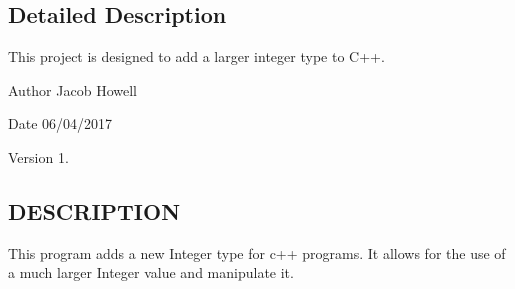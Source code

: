 \subsection{Detailed Description}
This project is designed to add a larger integer type to C++. 

\begin{DoxyAuthor}{Author}
Jacob Howell 
\end{DoxyAuthor}
\begin{DoxyDate}{Date}
06/04/2017 
\end{DoxyDate}
\begin{DoxyVersion}{Version}
1.
\end{DoxyVersion}
\subsection{D\+E\+S\+C\+R\+I\+P\+T\+I\+ON}\label{namespacestd_DESCRIPTION}
This program adds a new Integer type for c++ programs. It allows for the use of a much larger Integer value and manipulate it. 